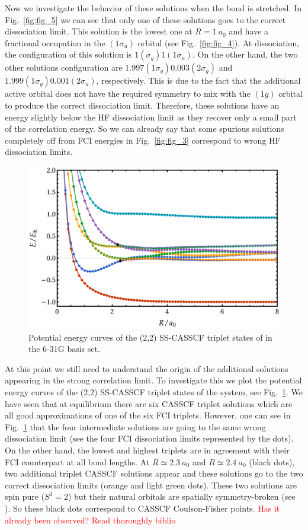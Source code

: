 \documentclass[aps,prb,reprint,showkeys,superscriptaddress]{revtex4-1}
\newcommand{\todo}[1]{\textcolor{red}{#1}}
\begin{document}
Now we investigate the behavior of these solutions when the bond is stretched.
In Fig.~\ref{fig:fig_5} we can see that only one of these solutions goes to the correct dissociation limit.
This solution is the lowest one at $R=1~a_0$ and have a fractional occupation in the $(1\sigma_u)$ orbital (see Fig.~\ref{fig:fig_4}).
At dissociation, the configuration of this solution is $1(\sigma_g)1(1\sigma_u)$.
On the other hand, the two other solutions configuration are $1.997(1\sigma_g)0.003(2\sigma_g)$ and $1.999(1\sigma_g)0.001(2\sigma_u)$, respectively.
This is due to the fact that the additional active orbital does not have the required symmetry to mix with the $(1g)$ orbital to produce the correct dissociation limit.
Therefore, these solutions have an energy slightly below the HF dissociation limit as they recover only a small part of the correlation energy.
So we can already say that some spurious solutions completely off from FCI energies in Fig.~\ref{fig:fig_3} correspond to wrong HF dissociation limits.

\begin{figure}
  \centering
  \includegraphics[width=0.9\linewidth]{Figures/fig_6.pdf}
  \caption{Potential energy curves of the (2,2) SS-CASSCF triplet states of  in the 6-31G basis set. \label{fig:fig_6}}
\end{figure}

At this point we still need to understand the origin of the additional solutions appearing in the strong correlation limit.
To investigate this we plot the potential energy curves of the (2,2) SS-CASSCF triplet states of the system, see Fig.~\ref{fig:fig_6}.
We have seen that at equilibrium there are six CASSCF triplet solutions which are all good approximations of one of the six FCI triplets.
However, one can see in Fig.~\ref{fig:fig_6} that the four intermediate solutions are going to the same wrong dissociation limit (see the four FCI dissociation limits represented by the dots).
On the other hand, the lowest and highest triplets are in agreement with their FCI counterpart at all bond lengths.
At $R\simeq 2.3~a_0$ and $R\simeq 2.4~a_0$ (black dots), two additional triplet CASSCF solutions appear and these solutions go to the two correct dissociation limits (orange and light green dots).
These two solutions are spin pure ($S^2=2$) but their natural orbitals are spatially symmetry-broken (see \SupInf).
So these black dots correspond to CASSCF Coulson-Fisher points. \todo{Has it already been observed? Read thoroughly biblio}
\end{document}
